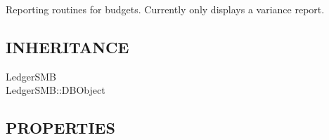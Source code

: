 \begin{description}
Reporting routines for budgets.  Currently only displays a variance report.

\subsection*{INHERITANCE\label{LedgerSMB::DBObject::Budget_Report_INHERITANCE}}
\begin{description}

\item[{LedgerSMB}] \mbox{}
\item[{LedgerSMB::DBObject}] \mbox{}\end{description}
\subsection*{PROPERTIES\label{LedgerSMB::DBObject::Budget_Report_PROPERTIES}}
\begin{description}


\end{description}
\end{description}
